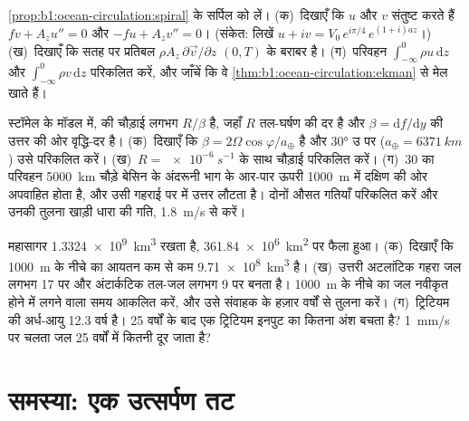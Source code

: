 \begin{exercise}[$\star\star\star$]\label{exo:b1:ocean-circulation:10}
\cref{prop:b1:ocean-circulation:spiral} के सर्पिल को लें। (क)~दिखाएँ कि $u$ और $v$ संतुष्ट करते हैं $f v + A_z u'' = 0$ और $-f u + A_z v'' = 0$।
(संकेत: लिखें $u + iv =
V_0\,e^{i\pi/4}\,e^{(1+i)az}$।) (ख)~दिखाएँ कि सतह पर प्रतिबल $\rho A_z\,\partial\vec
v/\partial z$  $(0, T)$ के बराबर है। (ग)~परिवहन $\int_{-\infty}^0 \rho u\,\mathrm dz$ और $\int_{-\infty}^0 \rho
v\,\mathrm dz$ परिकलित करें, और जाँचें कि वे \cref{thm:b1:ocean-circulation:ekman} से मेल खाते हैं।
\end{exercise}

\begin{exercise}[$\star\star\star$]\label{exo:b1:ocean-circulation:11}
स्टॉमेल के मॉडल में,  की चौड़ाई लगभग $R/\beta$ है,
जहाँ $R$ तल-घर्षण की दर है और $\beta = \mathrm df/\mathrm dy$  की उत्तर की ओर वृद्धि-दर है। (क)~दिखाएँ कि $\beta = 2\Omega
\cos\varphi/a_\oplus$ है और \ang{30} उ पर ($a_\oplus = \qty{6371}{km}$) उसे परिकलित करें।
(ख)~$R = \qty{e-6}{s^{-1}}$ के साथ चौड़ाई परिकलित करें। (ग)~\qty{30}{\sverdrup} का परिवहन \qty{5000}{km} चौड़े बेसिन के अंदरूनी भाग के आर-पार ऊपरी \qty{1000}{m} में दक्षिण की ओर अपवाहित होता है, और उसी गहराई पर  में उत्तर लौटता है। दोनों औसत गतियाँ परिकलित करें और उनकी तुलना खाड़ी धारा की गति, \qty{1.8}{m/s} से करें।
\end{exercise}

\begin{exercise}[$\star\star\star$]\label{exo:b1:ocean-circulation:12}
महासागर \qty{1.3324e9}{km^3} रखता है, \qty{361.84e6}{km^2} पर फैला हुआ। (क)~दिखाएँ कि \qty{1000}{m} के नीचे का आयतन कम से कम \qty{9.71e8}{km^3} है। (ख)~उत्तरी अटलांटिक गहरा जल लगभग \qty{17}{\sverdrup} पर और अंटार्कटिक तल-जल लगभग \qty{9}{\sverdrup} पर बनता है। \qty{1000}{m} के नीचे का जल नवीकृत होने में लगने वाला समय आकलित करें, और उसे संवाहक के हज़ार वर्षों से तुलना करें। (ग)~ट्रिटियम की अर्ध-आयु 12.3 वर्ष है। 25 वर्षों के बाद एक ट्रिटियम इनपुट का कितना अंश बचता है? \qty{1}{mm/s} पर चलता जल 25 वर्षों में कितनी दूर जाता है?
\end{exercise}

\section{समस्या: एक उत्सर्पण तट}

